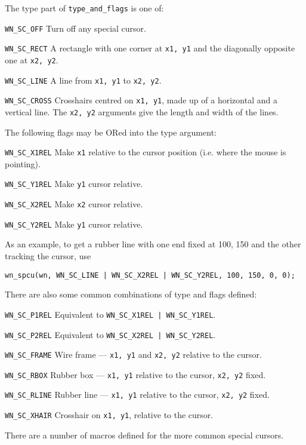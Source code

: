 The type part of {\tt type\_and\_flags} is one of:
\begin{list}{}{}
\item[\tt WN\_SC\_OFF]
Turn off any special cursor.
\item[\tt WN\_SC\_RECT]
A rectangle with one corner at {\tt x1, y1} and the diagonally opposite 
one at {\tt x2, y2}.
\item[\tt WN\_SC\_LINE]
A line from {\tt x1, y1} to {\tt x2, y2}.
\item[\tt WN\_SC\_CROSS]
Crosshairs centred on {\tt x1, y1}, made up of a horizontal and a vertical
line.
The {\tt x2, y2} arguments give the length and width of the lines.
\end{list}
The following flags may be ORed into the type argument:
\begin{list}{}{}
\item[\tt WN\_SC\_X1REL]
Make {\tt x1} relative to the cursor position (i.e. where the mouse is pointing).
\item[\tt WN\_SC\_Y1REL]
Make {\tt y1} cursor relative.
\item[\tt WN\_SC\_X2REL]
Make {\tt x2} cursor relative.
\item[\tt WN\_SC\_Y2REL]
Make {\tt y1} cursor relative.
\end{list}
As an example, to get a rubber line with one end fixed at 100, 150 and the
other tracking the cursor, use
\begin{verbatim}
wn_spcu(wn, WN_SC_LINE | WN_SC_X2REL | WN_SC_Y2REL, 100, 150, 0, 0);
\end{verbatim}
There are also some common combinations of type and flags defined:
\begin{list}{}{}
\item[\tt WN\_SC\_P1REL]
Equivalent to {\tt WN\_SC\_X1REL | WN\_SC\_Y1REL}.
\item[\tt WN\_SC\_P2REL]
Equivalent to {\tt WN\_SC\_X2REL | WN\_SC\_Y2REL}.
\item[\tt WN\_SC\_FRAME]
Wire frame --- {\tt x1, y1} and {\tt x2, y2} relative to the cursor.
\item[\tt WN\_SC\_RBOX]
Rubber box --- {\tt x1, y1} relative to the cursor, {\tt x2, y2} fixed.
\item[\tt WN\_SC\_RLINE]
Rubber line --- {\tt x1, y1} relative to the cursor, {\tt x2, y2} fixed.
\item[\tt WN\_SC\_XHAIR]
Crosshair on {\tt x1, y1}, relative to the cursor.
\end{list}
There are a number of macros defined for the more common special cursors.
